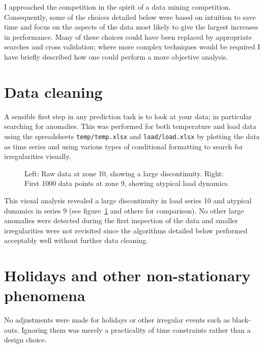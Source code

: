 \documentclass[preprint,authoryear,12pt]{elsarticle}
\begin{document}

I approached the competition in the spirit of a data mining competition.
Consequently, some of the choices detailed below were based on intuition to save time and focus on the aspects of the data most likely to give the largest increases in performance.
Many of these choices could have been replaced by appropriate searches and cross validation; where more complex techniques would be required I have briefly described how one could perform a more objective analysis.

\section{Data cleaning}

A sensible first step in any prediction task is to look at your data; in particular searching for anomalies.
This was performed for both temperature and load data using the spreadsheets \texttt{temp/temp.xlsx} and \texttt{load/load.xlsx} by plotting the data as time series and using various types of conditional formatting to search for irregularities visually.

\begin{figure}[ht]
  \begin{center}
    
  \end{center}
  \caption{Left: Raw data at zone 10, showing a large discontinuity. Right: First 1000 data points at zone 9, showing atypical load dynamics.}
  \label{fig:load}
\end{figure}

This visual analysis revealed a large discontinuity in load series 10 and atypical dunamics in series 9 (see figure~\ref{fig:load} and others for comparison).
No other large anomalies were detected during the first inspection of the data and smaller irregularities were not revisited since the algorithms detailed below performed acceptably well without further data cleaning.

\section{Holidays and other non-stationary phenomena}

No adjustments were made for holidays or other irregular events such as black-outs.
Ignoring them was merely a practicality of time constraints rather than a design choice.
\end{document}
